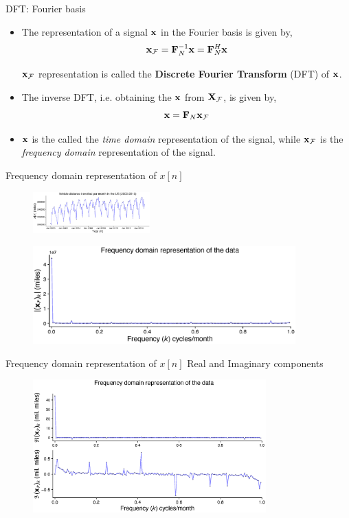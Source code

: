 \documentclass[aspectratio=169]{beamer}
\let\olditem\item
\renewcommand{\item}{\setlength{\itemsep}{\fill}\olditem}
\def\mf{\ensuremath\mathbf}
\def\mc{\ensuremath\mathcal}
\begin{document}
\begin{frame}[t]{DFT: Fourier basis}
  \begin{itemize}
    \item The representation of a signal $\mf{x}$ in the Fourier basis is given by,
    \[ \mf{x}_{\mc{F}} = \mf{F}_{N}^{-1} \mf{x} = \mf{F}_N^H \mf{x} \]

    $\mf{x}_{\mc{F}}$ representation is called the \textbf{Discrete Fourier Transform} (DFT) of $\mf{x}$.

    \item The inverse DFT, i.e. obtaining the $\mf{x}$ from $\mf{X}_{\mc{F}}$, is given by,
    \[ \mf{x} = \mf{F}_N \mf{x}_{\mc{F}} \]

    \item $\mf{x}$ is the called the \textit{time domain} representation of the signal, while $\mf{x}_{\mc{F}}$ is the \textit{frequency domain} representation of the signal.
  \end{itemize}
\end{frame}


\begin{frame}[t]{Frequency domain representation of $x[n]$}
  \begin{figure}[h]
    \includegraphics[width=0.4\textwidth]{figs/miles.eps}
  \end{figure}

  \begin{figure}[h]
    \includegraphics[width=0.9\textwidth]{figs/miles_fft.eps}
  \end{figure}
\end{frame}


\begin{frame}[t]{Frequency domain representation of $x[n]$}
  Real and Imaginary components
  \begin{figure}[h]
    \includegraphics[width=0.8\textwidth]{figs/miles_fft_reim.eps}
  \end{figure}
\end{frame}
\end{document}
